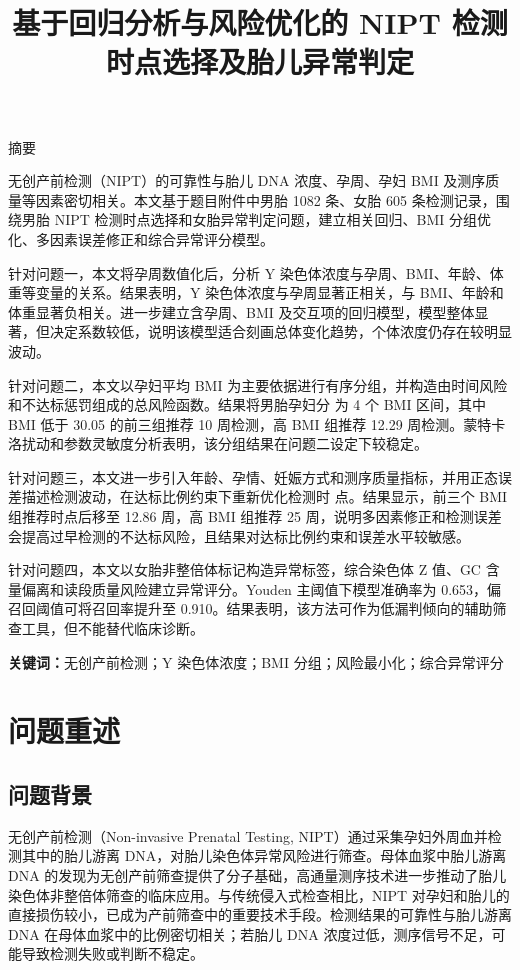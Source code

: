 \documentclass[UTF8,zihao=-4]{ctexart}
\title{基于回归分析与风险优化的 NIPT 检测时点选择及胎儿异常判定}
\author{}
\date{}
\makeatletter
\numberwithin{equation}{section}
\renewenvironment{abstract}
{\begin{center}\heiti\zihao{4} 摘\quad 要\end{center}\zihao{-4}\setlength{\parindent}{2em}}
{\par\vspace{0.8\baselineskip}}
\renewcommand{\maketitle}{
  \begin{center}
    \vspace*{0.5\baselineskip}
    {\heiti\zihao{2}\@title\par}
    \vspace{1.2\baselineskip}
  \end{center}
}
\makeatother
\begin{document}
\maketitle

\begin{abstract}
\noindent

无创产前检测（NIPT）的可靠性与胎儿 DNA 浓度、孕周、孕妇 BMI 及测序质量等因素密切相关。本文基于题目附件中男胎 1082 条、女胎 605 条检测记录，围绕男胎 NIPT 检测时点选择和女胎异常判定问题，建立相关回归、BMI 分组优化、多因素误差修正和综合异常评分模型。

针对问题一，本文将孕周数值化后，分析 Y 染色体浓度与孕周、BMI、年龄、体重等变量的关系。结果表明，Y 染色体浓度与孕周显著正相关，与 BMI、年龄和体重显著负相关。进一步建立含孕周、BMI 及交互项的回归模型，模型整体显著，但决定系数较低，说明该模型适合刻画总体变化趋势，个体浓度仍存在较明显波动。

针对问题二，本文以孕妇平均 BMI 为主要依据进行有序分组，并构造由时间风险和不达标惩罚组成的总风险函数。结果将男胎孕妇分
为 4 个 BMI 区间，其中 BMI 低于 30.05 的前三组推荐 10 周检测，高 BMI 组推荐 12.29 周检测。蒙特卡洛扰动和参数灵敏度分析表明，该分组结果在问题二设定下较稳定。

针对问题三，本文进一步引入年龄、孕情、妊娠方式和测序质量指标，并用正态误差描述检测波动，在达标比例约束下重新优化检测时
点。结果显示，前三个 BMI 组推荐时点后移至 12.86 周，高 BMI 组推荐 25 周，说明多因素修正和检测误差会提高过早检测的不达标风险，且结果对达标比例约束和误差水平较敏感。

针对问题四，本文以女胎非整倍体标记构造异常标签，综合染色体 Z 值、GC 含量偏离和读段质量风险建立异常评分。Youden 主阈值下模型准确率为 0.653，偏召回阈值可将召回率提升至 0.910。结果表明，该方法可作为低漏判倾向的辅助筛查工具，但不能替代临床诊断。


\textbf{关键词：}无创产前检测；Y 染色体浓度；BMI 分组；风险最小化；综合异常评分
\end{abstract}
\pagebreak
\section{问题重述}

\subsection{问题背景}

无创产前检测（Non-invasive Prenatal Testing, NIPT）通过采集孕妇外周血并检测其中的胎儿游离 DNA，对胎儿染色体异常风险进行筛查。母体血浆中胎儿游离 DNA 的发现为无创产前筛查提供了分子基础，高通量测序技术进一步推动了胎儿染色体非整倍体筛查的临床应用\cite{lo1997,bianchi2014}。与传统侵入式检查相比，NIPT 对孕妇和胎儿的直接损伤较小，已成为产前筛查中的重要技术手段。检测结果的可靠性与胎儿游离 DNA 在母体血浆中的比例密切相关；若胎儿 DNA 浓度过低，测序信号不足，可能导致检测失败或判断不稳定\cite{hui2020,deng2022}。
\end{document}
